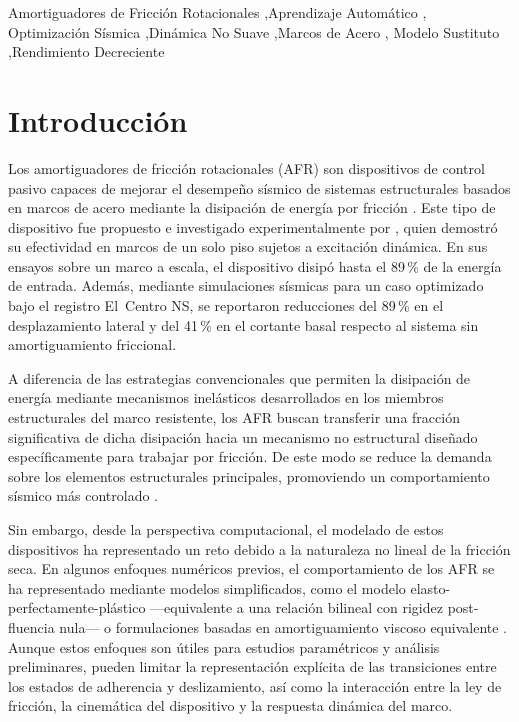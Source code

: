 \documentclass[preprint,12pt,authoryear]{elsarticle}
\begin{document}
\begin{frontmatter}
\begin{keyword}
Amortiguadores de Fricción Rotacionales \sep Aprendizaje Automático \sep
Optimización Sísmica \sep Dinámica No Suave \sep Marcos de Acero \sep
Modelo Sustituto \sep Rendimiento Decreciente
\end{keyword}

\end{frontmatter}

\section{Introducción}
\label{sec:intro}

Los amortiguadores de fricción rotacionales (AFR) son dispositivos de control
pasivo capaces de mejorar el desempeño sísmico de sistemas estructurales basados
en marcos de acero mediante la disipación de energía por fricción
\citep{pall_friction_1980, pall_response_1982, jaisee_state---art_2021}.
Este tipo de
dispositivo fue propuesto e investigado experimentalmente por \citet{Mualla2002},
quien demostró su efectividad en marcos de un solo piso sujetos a excitación
dinámica. En sus ensayos sobre un marco a escala, el dispositivo disipó hasta el
89\,\% de la energía de entrada. Además, mediante simulaciones sísmicas para un
caso optimizado bajo el registro El~Centro NS, se reportaron reducciones del
89\,\% en el desplazamiento lateral y del 41\,\% en el cortante basal respecto
al sistema sin amortiguamiento friccional.

A diferencia de las estrategias convencionales que permiten la disipación de
energía mediante mecanismos inelásticos desarrollados en los miembros
estructurales del marco resistente, los AFR buscan transferir una fracción
significativa de dicha disipación hacia un mecanismo no estructural diseñado
específicamente para trabajar por fricción. De este modo se reduce la demanda
sobre los elementos estructurales principales, promoviendo un comportamiento
sísmico más controlado \citep{de_domenico_editorial_2020}.

Sin embargo, desde la perspectiva computacional, el modelado de estos
dispositivos ha representado un reto debido a la naturaleza no lineal de la
fricción seca. En algunos enfoques numéricos previos, el comportamiento de los
AFR se ha representado mediante modelos simplificados, como el modelo
elasto-perfectamente-plástico ---equivalente a una relación bilineal con
rigidez post-fluencia nula--- o formulaciones basadas en amortiguamiento viscoso
equivalente \citep{lee_seismic_2025, Jarrahi2020jbe}. Aunque estos enfoques son
útiles para estudios paramétricos y análisis preliminares, pueden limitar la
representación explícita de las transiciones entre los estados de adherencia y
deslizamiento, así como la interacción entre la ley de fricción, la cinemática
del dispositivo y la respuesta dinámica del marco.
\end{document}
